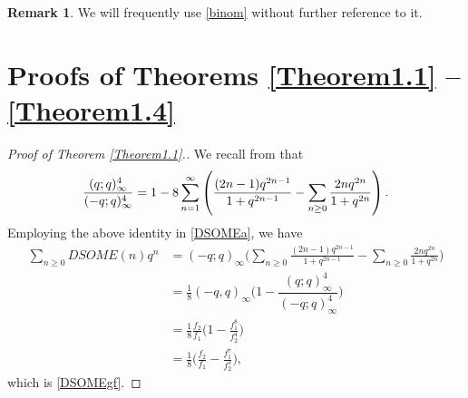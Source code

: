 \documentclass[12pt]{amsart}
\theoremstyle{definition}
\newtheorem{remark}[theorem]{Remark}
\numberwithin{equation}{section}
\begin{document}
\begin{remark}
 We will frequently use \eqref{binom} without further reference to it.   
\end{remark} 

    \section{Proofs of Theorems \ref{Theorem1.1} --\ref{Theorem1.4}}\label{sec3}
  \begin{proof}[ Proof of Theorem \ref{Theorem1.1}.]
 We recall from \cite[p.~61, Eq. (3.3.6)]{spirit} that
 \begin{align}
        \dfrac{(q;q)_\infty^4}{(-q;q)_\infty^4}=1-8\sum_{n=1}^{\infty}\left(\frac{(2n-1)q^{2n-1}}{1+q^{2n-1}}-\sum_{n\geq0}\frac{2nq^{2n}}{1+q^{2n}}\right).\notag
  \end{align}
  Employing the above identity in \eqref{DSOMEa}, we have
  \begin{align*}
    \sum_{n\geq0}DSOME(n)q^n&=(-q;q)_\infty\bigg( \sum_{n\geq0}\frac{(2n-1)q^{2n-1}}{1+q^{2n-1}}-\sum_{n\geq0}\frac{2nq^{2n}}{1+q^{2n}}\bigg)\\
    &=\frac{1}{8}(-q,q)_\infty\bigg(1-\dfrac{(q;q)_\infty^4}{(-q;q)_\infty^4}\bigg)\\
    &=\frac{1}{8}\frac{f_2}{f_1}\bigg(1-\frac{f_1^8}{f_2^4}\bigg)\\
    &=\frac{1}{8}\bigg(\frac{f_2}{f_1}-\frac{f_1^7}{f_2^3}\bigg),  
\end{align*}
which is \eqref{DSOMEgf}.
 \end{proof}
\end{document}
